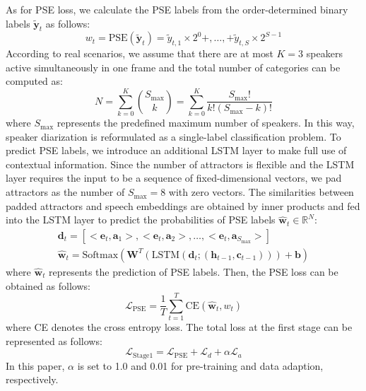 \documentclass{article}
\begin{document}
As for PSE loss, we calculate the PSE labels from the order-determined binary labels $\mathbf{\widetilde{y}}_{t}$ as follows:
\begin{equation}
    w_{t}=\text{PSE}(\mathbf{\widetilde{y}}_{t})=\widetilde{y}_{t,1} \times 2^{0} +,\ldots,+\widetilde{y}_{t,S} \times 2 ^ {S-1} 
\end{equation}
According to real scenarios, we assume that there are at most $K=3$ speakers active simultaneously in one frame and the total number of categories can be computed as:
\begin{equation}
    N=\sum_{k=0}^{K} \binom{S_{\text{max}}}{k} =\sum_{k=0}^{K} \frac{S_{\text{max}}!}{k!(S_{\text{max}}-k)!}
\end{equation}
where $S_{\text{max}}$ represents the predefined maximum number of speakers.
In this way, speaker diarization is reformulated as a single-label classification problem. To predict PSE labels, we introduce an additional LSTM layer to make full use of contextual information. Since the number of attractors is flexible and the LSTM layer requires the input to be a sequence of fixed-dimensional vectors, we pad attractors as the number of $S_{\text{max}}=8$ with zero vectors. The similarities between padded attractors and speech embeddings are obtained by inner products and fed into the LSTM layer to predict the probabilities of PSE labels $\hat{\mathbf{w}}_t \in \mathbb{R}^{N}$: 
\begin{equation}
\begin{gathered}
    \mathbf{d}_t = [<\mathbf{e}_t,\mathbf{a}_1>,<\mathbf{e}_t,\mathbf{a}_2>,\dots,<\mathbf{e}_t,\mathbf{a}_{S_\text{max}}>] \\
    \hat{\mathbf{w}}_t =\text{Softmax}( \mathbf{W}^{T}(\text{LSTM}(\mathbf{d}_{t};(\mathbf{h}_{t-1},\mathbf{c}_{t-1})))+\mathbf{b})
\end{gathered}
\end{equation}
where $\hat{\mathbf{w}}_t$ represents the prediction of PSE labels. Then, the PSE loss can be obtained as follows:
\begin{equation}
    \mathcal{L}_{\text{PSE}} = \frac{1}{T}\sum_{t=1}^{T} \text{CE}\left(\hat{\mathbf{w}}_t, w_{t}\right)
\end{equation}
where CE denotes the cross entropy loss.
The total loss at the first stage can be represented as follows:
\begin{equation}
    \mathcal{L}_{\text{Stage1}}=\mathcal{L}_{\text{PSE}} + \mathcal{L}_{d} + \alpha \mathcal{L}_{a}
    \label{eq:pse_loss}
\end{equation}
In this paper, $\alpha$ is set to 1.0 and 0.01 for pre-training and data adaption, respectively.
\end{document}
